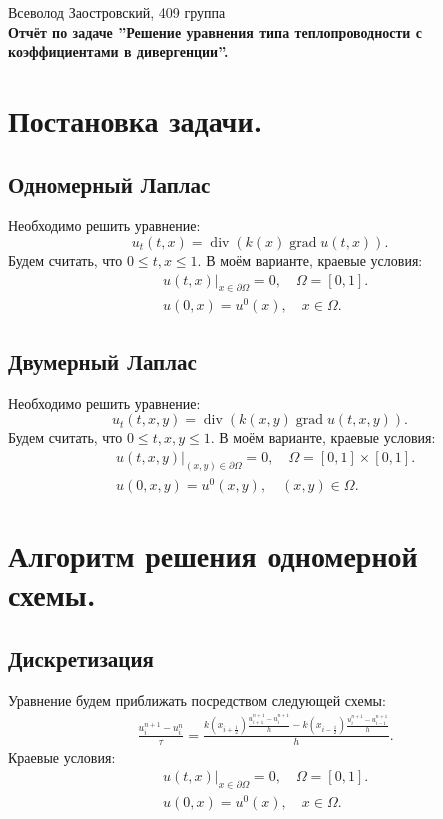 \documentclass[14pt,a4paper]{extarticle}
\newcommand{\1}{\mathbbm{1}}
\begin{document}
\begin{center}
    {Всеволод Заостровский, 409 группа}\\
    {\bfseries Отчёт по задаче ''Решение уравнения типа теплопроводности с коэффициентами в дивергенции''.\\}
    \vspace{1cm}
\end{center}

\tableofcontents

\section{Постановка задачи.} \label{diffeq1}
\subsection{Одномерный Лаплас}
Необходимо решить уравнение:
\begin{equation*} 
    u_t(t, x) = \operatorname{div} (k(x) \operatorname{grad} u(t, x)).
\end{equation*}
Будем считать, что $0 \leq t,x \leq 1$. В моём варианте, краевые условия:
\begin{align*} 
    &u(t, x) \big| _{x \in \partial \Omega} = 0, \quad \Omega = [0,1]. \\
    &u(0, x) = u^0(x), \quad x \in \Omega. 
\end{align*}

\subsection{Двумерный Лаплас}
Необходимо решить уравнение:
\begin{equation*} 
    u_t(t, x, y) = \operatorname{div} (k(x, y) \operatorname{grad} u(t, x, y)).
\end{equation*}
Будем считать, что $0 \leq t,x,y \leq 1$. В моём варианте, краевые условия:
\begin{align*} 
    &u(t, x, y) \big| _{(x ,y) \in \partial \Omega} = 0, \quad \Omega = [0,1] \times [0,1]. \\
    &u(0, x, y) = u^0(x, y), \quad (x, y) \in \Omega. 
\end{align*}

\section{Алгоритм решения одномерной схемы.}
\subsection{Дискретизация}
Уравнение будем приближать посредством следующей схемы:
\begin{align*}
    &\frac{u^{n+1}_i - u^n_i}{\tau} = \frac{k(x_{i + \frac{1}{2}}) \frac{u^{n+1}_{i+1} - u^{n+1}_{i}}{h} - k(x_{i- \frac{1}{2}}) \frac{u^{n+1}_{i} - u^{n+1}_{i-1}}{h}}{h}.
\end{align*}
Краевые условия:
\begin{align*} 
    &u(t, x) \big| _{x \in \partial \Omega} = 0, \quad \Omega = [0,1]. \\
    &u(0, x) = u^0(x), \quad x \in \Omega. 
\end{align*}
\end{document}
